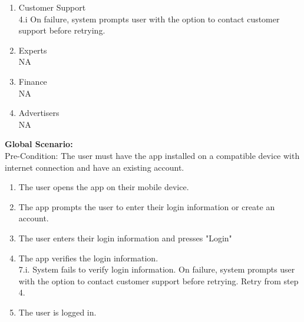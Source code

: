 \documentclass[]{article}
\begin{document}
\begin{enumerate}[{\bf BE1.}]
\begin{enumerate}[{\bf VP1. }]
        \item Customer Support \\
        4.i On failure, system prompts user with the option to contact customer support before
retrying. \\
        \item Experts\\
        NA
        \item Finance \\
        NA
        \item Advertisers\\
        NA \\
    \end{enumerate}
    {\bf Global Scenario:}\\
    Pre-Condition: The user must have the app installed on a compatible device with internet connection and have an existing account.
    \begin{enumerate}[{1.}]
        \item The user opens the app on their mobile device. 
        \item The app prompts the user to enter their login information or create an account.
        \item The user enters their login information and presses "Login"
        \item The app verifies the login information. \\ 7.i. System fails to verify login information. On failure, system prompts user with the option to contact customer support before retrying. Retry from step 4. \\
        \item The user is logged in.  
    \end{enumerate}


\end{enumerate}
\end{document}
